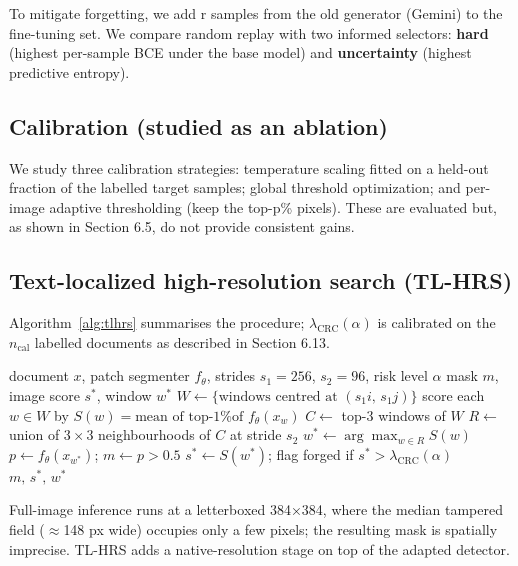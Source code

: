 \documentclass[preprint,12pt]{elsarticle}
\begin{document}
To mitigate forgetting, we add r samples from the old generator (Gemini) to the fine-tuning set. We compare random replay with two informed selectors: \textbf{hard} (highest per-sample BCE under the base model) and \textbf{uncertainty} (highest predictive entropy).

\subsection{Calibration (studied as an ablation)}\label{calibration-studied-as-an-ablation}

We study three calibration strategies: temperature scaling fitted on a held-out fraction of the labelled target samples; global threshold optimization; and per-image adaptive thresholding (keep the top-p\% pixels). These are evaluated but, as shown in Section 6.5, do not provide consistent gains.

\subsection{Text-localized high-resolution search (TL-HRS)}\label{text-localized-high-resolution-search-tl-hrs}

Algorithm~\ref{alg:tlhrs} summarises the procedure; $\lambda_{\mathrm{CRC}}(\alpha)$ is calibrated on the $n_{\mathrm{cal}}$ labelled documents as described in Section 6.13.

\begin{algorithm}[htbp]
\caption{TL-HRS with risk control}
\label{alg:tlhrs}
\begin{algorithmic}[1]
\Require document $x$, patch segmenter $f_\theta$, strides $s_1{=}256$, $s_2{=}96$, risk level $\alpha$
\Ensure mask $m$, image score $s^*$, window $w^*$
\State $W \gets \{\text{windows centred at }(s_1 i,\, s_1 j)\}$
\State score each $w\in W$ by $S(w)=\text{mean of top-1\% of } f_\theta(x_w)$
\State $C \gets$ top-3 windows of $W$
\State $R \gets$ union of $3\times3$ neighbourhoods of $C$ at stride $s_2$
\State $w^* \gets \arg\max_{w\in R} S(w)$
\State $p \gets f_\theta(x_{w^*})$; \quad $m \gets p > 0.5$
\State $s^* \gets S(w^*)$; \quad flag forged if $s^* > \lambda_{\mathrm{CRC}}(\alpha)$
\State \Return $m,\, s^*,\, w^*$
\end{algorithmic}
\end{algorithm}

Full-image inference runs at a letterboxed 384×384, where the median tampered field ($\approx$148 px wide) occupies only a few pixels; the resulting mask is spatially imprecise. TL-HRS adds a native-resolution stage on top of the adapted detector.
\end{document}
